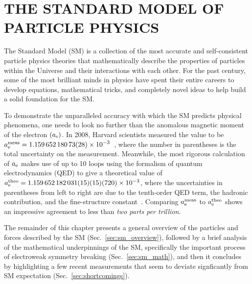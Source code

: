 \chapter{THE STANDARD MODEL OF PARTICLE PHYSICS}
\label{ch:theory}
The Standard Model (SM) is a collection of the most accurate and self-consistent particle physics theories that mathematically describe the properties of particles within the Universe and their interactions with each other.
For the past century, some of the most brilliant minds in physics have spent their entire careers to develop equations, mathematical tricks, and completely novel ideas to help build a solid foundation for the SM.

To demonstrate the unparalleled accuracy with which the SM predicts physical phenomena, one needs to look no further than the anomalous magnetic moment of the electron $\left( a_\mathrm{e} \right)$.
In 2008, Harvard scientists measured the value to be $a_\mathrm{e}^{\text{meas}} = 1.159\,652\,180\,73(28) \times \text{10}^\text{$-$3}$~\cite{Hanneke:2008tm},
where the number in parentheses is the total uncertainty on the measurement.
Meanwhile, the most rigorous calculation of $a_\mathrm{e}$ makes use of up to 10 loops using the formalism of quantum electrodynamics (QED) to give a theoretical value of $a_\mathrm{e}^{\text{theo}} = 1.159\,652\,182\,031(15)(15)(720) \times \text{10}^\text{$-$3}$,
where the uncertainties in parentheses from left to right are due to the tenth-order QED term, the hadronic contribution, and the fine-structure constant~\cite{Aoyama:2014sxa}.
Comparing $a_\mathrm{e}^{\text{meas}}$ to $a_\mathrm{e}^{\text{theo}}$ shows an impressive agreement to less than \emph{two parts per trillion}.

The remainder of this chapter presents a general overview of the particles and forces described by the SM (Sec.~\ref{sec:sm_overview}),
followed by a brief analysis of the mathematical underpinnings of the SM, specifically the important process of electroweak symmetry breaking (Sec.~\ref{sec:sm_math}),
and then it concludes by highlighting a few recent measurements that seem to deviate signficantly from SM expectation (Sec.~\ref{sec:shortcomings}).

